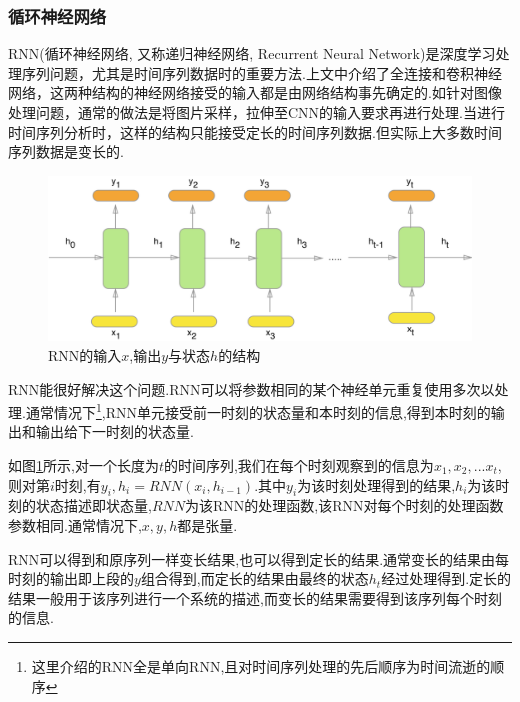 \subsubsection{循环神经网络} \label{section:rnn}
RNN(循环神经网络, 又称递归神经网络, Recurrent Neural Network)是深度学习处理序列问题，尤其是时间序列数据时的重要方法.上文中介绍了全连接和卷积神经网络，这两种结构的神经网络接受的输入都是由网络结构事先确定的.如针对图像处理问题，通常的做法是将图片采样，拉伸至CNN的输入要求再进行处理.当进行时间序列分析时，这样的结构只能接受定长的时间序列数据.但实际上大多数时间序列数据是变长的.
\par
\begin{figure}[htbp!]
    \centering
    \includegraphics[width = 1.\textwidth]{chap/img/rnn.png}
    \caption{
        RNN的输入$x$,输出$y$与状态$h$的结构\supercite{how_rnn_work}
        }\label{fig:rnn}
\end{figure}
\par
RNN能很好解决这个问题.RNN可以将参数相同的某个神经单元重复使用多次以处理.通常情况下\footnote{这里介绍的RNN全是单向RNN,且对时间序列处理的先后顺序为时间流逝的顺序},RNN单元接受前一时刻的状态量和本时刻的信息,得到本时刻的输出和输出给下一时刻的状态量.
\par
如图\ref{fig:rnn}所示,对一个长度为$t$的时间序列,我们在每个时刻观察到的信息为$x_1, x_2, ...x_t$,则对第$i$时刻,有$y_i,h_i = RNN(x_i, h_{i-1})$.其中$y_i$为该时刻处理得到的结果,$h_i$为该时刻的状态描述即状态量,$RNN$为该RNN的处理函数,该RNN对每个时刻的处理函数参数相同.通常情况下,$x,y,h$都是张量.
\par
RNN可以得到和原序列一样变长结果,也可以得到定长的结果.通常变长的结果由每时刻的输出即上段的$y$组合得到,而定长的结果由最终的状态$h_t$经过处理得到.定长的结果一般用于该序列进行一个系统的描述,而变长的结果需要得到该序列每个时刻的信息.
\par

